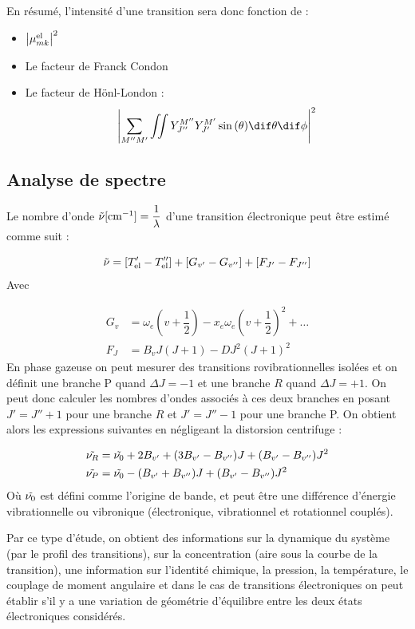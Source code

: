 En résumé, l'intensité d'une transition sera donc fonction de  :
\begin{itemize}
    \item $\abs{\mu_{mk}^\text{el}}^2$
    \item Le facteur de Franck Condon
    \item Le facteur de Hönl-London : 
    \[
        \abs{\sum\limits_{M''M'}\iint Y_{J''}^{M''}Y_{J'}^{M'}\sin{(\theta)}\dif\theta \dif\phi}^2
    \]
\end{itemize}


\subsection{Analyse de spectre}

Le nombre d'onde $\Tilde{\nu}[\si{cm^{-1}}]=\dfrac{1}{\lambda}$ d'une transition électronique peut être estimé comme suit :

\[
    \Tilde{\nu} = [T_\text{el}'-T_\text{el}''] + [G_{v'}-G_{v''}] + [F_{J'}-F_{J''}]
\]
Avec

\begin{align*}
    G_v &= \omega_e(v+\dfrac{1}{2})-x_e\omega_e(v+\dfrac{1}{2})^2 + \hdots\\
    F_J &= B_vJ(J+1) - DJ^2(J+1)^2
\end{align*}
En phase gazeuse on peut mesurer des transitions rovibrationnelles isolées et on définit une branche P quand $\Delta J =-1$ et une branche $R$ quand $\Delta J =+1$. On peut donc calculer les nombres d'ondes associés à ces deux branches en posant $J' = J''+1$ pour une branche $R$ et $J' = J'' - 1$ pour une branche P. On obtient alors les expressions suivantes en négligeant la distorsion centrifuge :

\begin{align*}
    \Tilde{\nu_R} &= \Tilde{\nu_0} + 2B_{v'} + (3B_{v'}-B_{v''})J + (B_{v'}-B_{v''})J^2\\
    \Tilde{\nu_P} &= \Tilde{\nu_0} - (B_{v'}+B_{v''})J + (B_{v'}-B_{v''})J^2
\end{align*}
Où $\Tilde{\nu_0}$ est défini comme l'origine de bande, et peut être une différence d'énergie vibrationnelle ou vibronique (électronique, vibrationnel et rotationnel couplés).

Par ce type d’étude, on obtient des informations sur la dynamique du système (par le profil des transitions), sur la concentration (aire sous la courbe de la transition), une information sur l’identité chimique, la pression, la température, le couplage de moment angulaire et dans le cas de transitions électroniques on peut établir s’il y a une variation de géométrie d’équilibre entre les deux états électroniques considérés.
